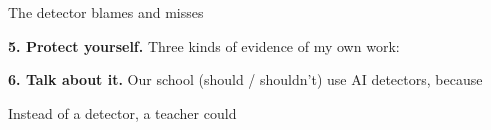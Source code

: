 \documentclass[11pt]{article}
\begin{document}
\vspace{0.7em}
The detector blames  and misses 

\vspace{1.0em}
{\large\textbf{5. Protect yourself.}} Three kinds of evidence of my own work:

\vspace{0.5em}
 \quad {} \quad {}

\vspace{1.0em}
{\large\textbf{6. Talk about it.}} Our school (should / shouldn't) use AI detectors, because

\vspace{0.6em}

\vspace{0.7em}
Instead of a detector, a teacher could 
\end{document}
